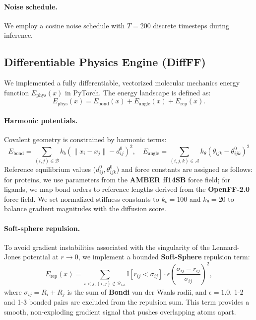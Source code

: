 \documentclass[twocolumn,10pt]{article}
\newcommand{\Ephys}{E_{\text{phys}}}
\begin{document}
\paragraph{Noise schedule.}
We employ a cosine noise schedule with $T=200$ discrete timesteps during inference.

\subsection{Differentiable Physics Engine (DiffFF)}

We implemented a fully differentiable, vectorized molecular mechanics energy function $\Ephys(x)$ in PyTorch. The energy landscape is defined as:
\begin{equation}
E_{\mathrm{phys}}(x) = E_{\mathrm{bond}}(x) + E_{\mathrm{angle}}(x) + E_{\mathrm{rep}}(x).
\end{equation}

\paragraph{Harmonic potentials.} Covalent geometry is constrained by harmonic terms:
\begin{equation}
E_{\text{bond}} = \sum_{(i,j) \in \mathcal{B}} k_b (\|x_i - x_j\| - d_{ij}^0)^2, \quad E_{\text{angle}} = \sum_{(i,j,k) \in \mathcal{A}} k_\theta (\theta_{ijk} - \theta_{ijk}^0)^2
\end{equation}
Reference equilibrium values ($d_{ij}^0, \theta_{ijk}^0$) and force constants are assigned as follows: for proteins, we use parameters from the \textbf{AMBER ff14SB} force field; for ligands, we map bond orders to reference lengths derived from the \textbf{OpenFF-2.0} force field. We set normalized stiffness constants to $k_b=100$ and $k_\theta=20$ to balance gradient magnitudes with the diffusion score.

\paragraph{Soft-sphere repulsion.}
To avoid gradient instabilities associated with the singularity of the Lennard-Jones potential at $r \to 0$, we implement a bounded \textbf{Soft-Sphere} repulsion term:
\begin{equation}
E_{\mathrm{rep}}(x) = \sum_{i<j, (i,j) \notin \mathcal{B}_{1\text{-}3}} \mathbb{I}[r_{ij}<\sigma_{ij}] \cdot \epsilon \left(\frac{\sigma_{ij}-r_{ij}}{\sigma_{ij}}\right)^2,
\end{equation}
where $\sigma_{ij} = R_i + R_j$ is the sum of \textbf{Bondi} van der Waals radii, and $\epsilon=1.0$. 1-2 and 1-3 bonded pairs are excluded from the repulsion sum. This term provides a smooth, non-exploding gradient signal that pushes overlapping atoms apart.
\end{document}
